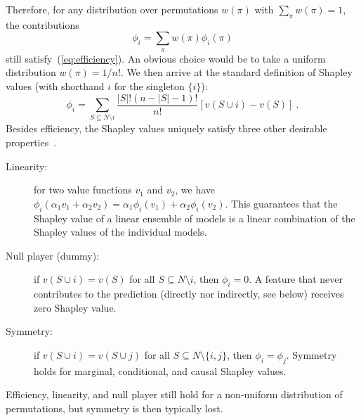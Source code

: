 \documentclass{article}
\newcommand{\vX}{\mathbf{X}}
\newcommand{\vx}{\mathbf{x}}
\newcommand{\expectation}{\mathbb{E}}
\newcommand{\contribution}{{\phi}}
\newcommand{\val}{{v}}
\newcommand{\perm}{\pi}
\newcommand{\operator}{\mathit{op}}
\newcommand{\svop}[1]{\operator(\vx_{#1})}
\newcommand{\allfeatures}{{N}}
\begin{document}
Therefore, for any distribution over permutations $w(\perm)$ with $\sum_{\perm} w(\perm) = 1$, the contributions
\begin{equation}
\contribution_i = \sum_{\perm} w(\perm) \contribution_i(\perm)
\label{eq:shapperm}
\end{equation}
still satisfy~(\ref{eq:efficiency}). An obvious choice would be to take a uniform distribution $w(\perm) = 1/n!$. We then arrive at the standard definition of Shapley values (with shorthand $i$ for the singleton $\{i\}$):
\[
\contribution_i = \sum_{S \subseteq \allfeatures\setminus i} \frac{|S|! (n-|S|-1)!}{n!} \left[\val(S \cup i) - \val(S) \right] \: .
\]
Besides efficiency, the Shapley values uniquely satisfy three other desirable properties~\cite{shapley1953value}.
\begin{description}
	\item[Linearity:] for two value functions $\val_1$ and $\val_2$, we have $\contribution_i(\alpha_1 \val_1 + \alpha_2 \val_2) = \alpha_1 \contribution_i(\val_1) + \alpha_2 \contribution_i(\val_2)$. This guarantees that the Shapley value of a linear ensemble of models is a linear combination of the Shapley values of the individual models.
	\item[Null player (dummy):] if $\val(S \cup i) = \val(S)$ for all $S \subseteq \allfeatures \setminus i$, then $\contribution_i = 0$. A feature that never contributes to the prediction (directly nor indirectly, see below) receives zero Shapley value.
	\item[Symmetry:] if $\val(S \cup i) = \val(S \cup j)$ for all  $S \subseteq \allfeatures \setminus \{i,j\}$, then $\contribution_i = \contribution_j$. Symmetry holds for marginal, conditional, and causal Shapley values.
\end{description}
Efficiency, linearity, and null player still hold for a non-uniform distribution of permutations, but symmetry is then typically lost.
\end{document}
